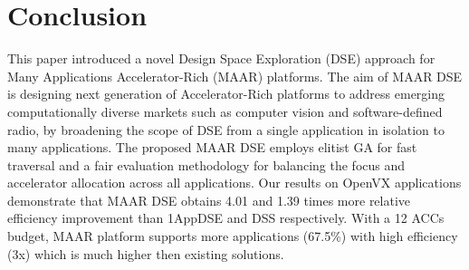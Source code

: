 \vspace{-2pt}
\section{Conclusion}
\label{sec:conclusion}
This paper introduced a novel Design Space Exploration (DSE) approach for Many Applications Accelerator-Rich (MAAR) platforms. The aim of MAAR DSE is designing next generation of Accelerator-Rich platforms to address emerging computationally diverse markets such as computer vision and software-defined radio, by broadening the scope of DSE from a single application in isolation to many applications. The proposed MAAR DSE employs elitist GA for fast traversal and a fair evaluation methodology for balancing the focus and accelerator allocation across all applications. Our results on OpenVX applications demonstrate that MAAR DSE obtains 4.01 and 1.39 times more relative efficiency improvement than 1AppDSE and DSS respectively. With a 12 ACCs budget, MAAR platform supports more applications (67.5\%) with high efficiency (3x) which is much higher then existing solutions. 



